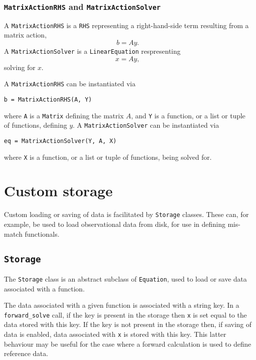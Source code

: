 \documentclass[11pt]{article}
\begin{document}
\subsubsection{\texttt{MatrixActionRHS} and \texttt{MatrixActionSolver}}

A \texttt{MatrixActionRHS} is a \texttt{RHS} representing a right-hand-side
term resulting from a matrix action,
\begin{equation*}
  b = A y.
\end{equation*}
A \texttt{MatrixActionSolver} is a \texttt{LinearEquation} respresenting
\begin{equation*}
  x = A y,
\end{equation*}
solving for $x$.

A \texttt{MatrixActionRHS} can be instantiated via
\begin{lstlisting}
b = MatrixActionRHS(A, Y)
\end{lstlisting}
where \texttt{A} is a \texttt{Matrix} defining the matrix $A$, and \texttt{Y}
is a function, or a list or tuple of functions, defining $y$. A
\texttt{MatrixActionSolver} can be instantiated via
\begin{lstlisting}
eq = MatrixActionSolver(Y, A, X)
\end{lstlisting}
where \texttt{X} is a function, or a list or tuple of functions, being solved
for.

\section{Custom storage}

Custom loading or saving of data is facilitated by \texttt{Storage} classes.
These can, for example, be used to load observational data from disk, for use
in defining mis-match functionals.

\subsection{\texttt{Storage}}

The \texttt{Storage} class is an abstract subclass of \texttt{Equation}, used
to load or save data associated with a function.

The data associated with a given function is associated with a string key. In
a \texttt{forward\_solve} call, if the key is present in the storage then
\texttt{x} is set equal to the data stored with this key. If the key is not
present in the storage then, if saving of data is enabled, data associated with
\texttt{x} is stored with this key. This latter behaviour may be useful for the
case where a forward calculation is used to define reference data.
\end{document}

